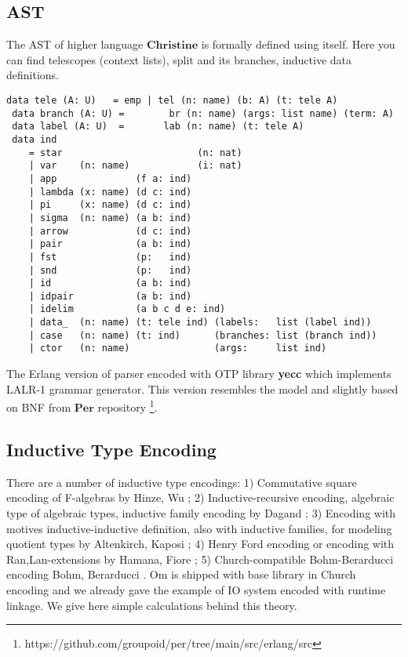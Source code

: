 \documentclass{article}
\begin{document}
\newpage
\subsection{AST}
The AST of higher language $\mathbf{Christine}$ is formally defined using itself.
Here you can find telescopes (context lists), split and its branches, inductive data definitions.

\begin{lstlisting}[mathescape=true]
 data tele (A: U)   = emp | tel (n: name) (b: A) (t: tele A)
 data branch (A: U) =        br (n: name) (args: list name) (term: A)
 data label (A: U)  =       lab (n: name) (t: tele A)
 data ind
    = star                        (n: nat)
    | var    (n: name)            (i: nat)
    | app              (f a: ind)
    | lambda (x: name) (d c: ind)
    | pi     (x: name) (d c: ind)
    | sigma  (n: name) (a b: ind)
    | arrow            (d c: ind)
    | pair             (a b: ind)
    | fst              (p:   ind)
    | snd              (p:   ind)
    | id               (a b: ind)
    | idpair           (a b: ind)
    | idelim           (a b c d e: ind)
    | data_  (n: name) (t: tele ind) (labels:   list (label ind))
    | case   (n: name) (t: ind)      (branches: list (branch ind))
    | ctor   (n: name)               (args:     list ind)
\end{lstlisting}

The Erlang version of parser encoded with OTP library {\bf yecc} which implements LALR-1 grammar generator.
This version resembles the model and slightly based on BNF from $\mathbf{Per}$
repository \footnote{https://github.com/groupoid/per/tree/main/src/erlang/src}.

\subsection{Inductive Type Encoding}
There are a number of inductive type encodings:
1) Commutative square encoding of F-algebras by Hinze, Wu \cite{Hinze13};
2) Inductive-recursive encoding, algebraic type of algebraic types, inductive family encoding by Dagand \cite{Dagand13};
3) Encoding with motives inductive-inductive definition, also with inductive families, for modeling quotient types by Altenkirch, Kaposi \cite{Kaposi16};
4) Henry Ford encoding or encoding with Ran,Lan-extensions by Hamana, Fiore \cite{Hamana11};
5) Church-compatible Bohm-Berarducci encoding Bohm, Berarducci \cite{Bohm85}.
Om is shipped with base library in Church encoding and we already gave the example of IO system encoded with runtime linkage.
We give here simple calculations behind this theory.
\end{document}
